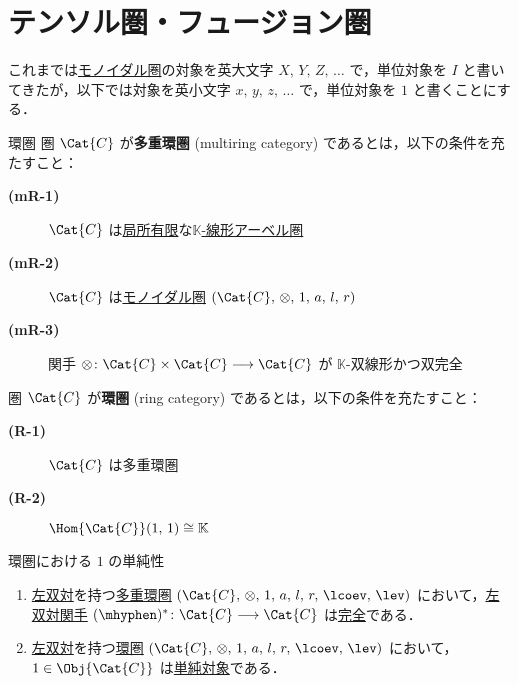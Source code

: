 \documentclass[TQFT_main]{subfiles}
\begin{document}
\section{テンソル圏・フュージョン圏}

\begin{marker}
    これまでは\hyperref[redef:monoidal-category]{モノイダル圏}の対象を英大文字 $X,\, Y,\, Z,\, \dots$ で，単位対象を $I$ と書いてきたが，以下では対象を英小文字 $x,\, y,\, z,\, \dots$ で，単位対象を $1$ と書くことにする．
\end{marker}

\begin{mydef}[label=def:ringcat]{環圏}
    圏 $\Cat{C}$ が\textbf{多重環圏} (multiring category) であるとは，以下の条件を充たすこと：
    \begin{description}
        \item[\textbf{(mR-1)}] $\Cat{C}$ は\hyperref[def:finite-abcat]{局所有限}な\hyperref[def:additive-cat]{$\mathbb{K}$-線形アーベル圏}
        \item[\textbf{(mR-2)}] $\Cat{C}$ は\hyperref[redef:rigid]{モノイダル圏} $(\Cat{C},\, \otimes,\, 1,\, a,\, l,\, r)$
        \item[\textbf{(mR-3)}] 関手 $\otimes \colon \Cat{C} \times \Cat{C} \lto \Cat{C}$ が $\mathbb{K}$-双線形かつ双完全
    \end{description}
    圏 $\Cat{C}$ が\textbf{環圏} (ring category) であるとは，以下の条件を充たすこと：
    \begin{description}
        \item[\textbf{(R-1)}] $\Cat{C}$ は多重環圏
        \item[\textbf{(R-2)}] $\Hom{\Cat{C}} (1,\, 1) \cong \mathbb{K}$ 
    \end{description}
\end{mydef}

\begin{mylem}[label=lem:1-simple-ringcat]{環圏における $1$ の単純性}
    \begin{enumerate}
        \item \hyperref[redef:dual]{左双対}を持つ\hyperref[def:ringcat]{多重環圏} $(\Cat{C},\, \otimes,\, 1,\, a,\, l,\, r,\, \lcoev,\, \lev)$ において，\hyperref[lem:ldual-functor]{左双対関手} $(\mhyphen)^* \colon \Cat{C} \lto \Cat{C}$ は\hyperref[def:additive-exact]{完全}である．
        \item \hyperref[redef:dual]{左双対}を持つ\hyperref[def:ringcat]{環圏} $(\Cat{C},\, \otimes,\, 1,\, a,\, l,\, r,\, \lcoev,\, \lev)$ において，$1 \in \Obj{\Cat{C}}$ は\hyperref[def:semisimple-cat]{単純対象}である．
    \end{enumerate}
\end{mylem}
\end{document}
